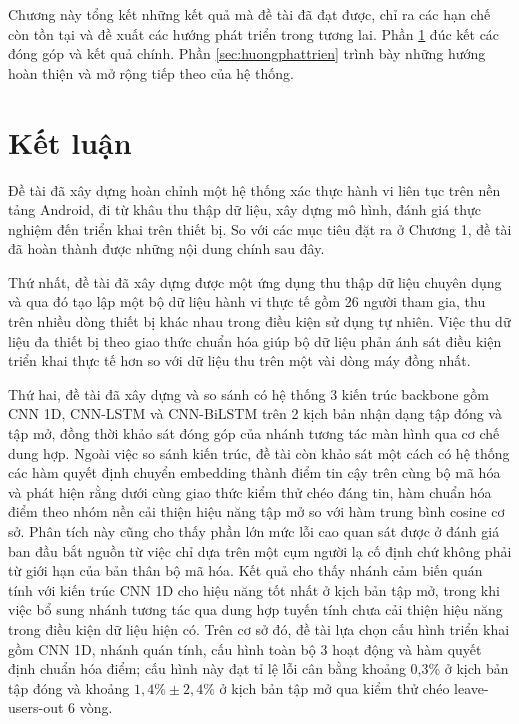 \documentclass[../DoAn.tex]{subfiles}
\begin{document}
Chương này tổng kết những kết quả mà đề tài đã đạt được, chỉ ra các hạn chế còn tồn tại và đề xuất các hướng phát triển trong tương lai. Phần \ref{sec:ketluan} đúc kết các đóng góp và kết quả chính. Phần \ref{sec:huongphattrien} trình bày những hướng hoàn thiện và mở rộng tiếp theo của hệ thống.

\section{Kết luận}
\label{sec:ketluan}

Đề tài đã xây dựng hoàn chỉnh một hệ thống xác thực hành vi liên tục trên nền tảng Android, đi từ khâu thu thập dữ liệu, xây dựng mô hình, đánh giá thực nghiệm đến triển khai trên thiết bị. So với các mục tiêu đặt ra ở Chương 1, đề tài đã hoàn thành được những nội dung chính sau đây.

Thứ nhất, đề tài đã xây dựng được một ứng dụng thu thập dữ liệu chuyên dụng và qua đó tạo lập một bộ dữ liệu hành vi thực tế gồm 26 người tham gia, thu trên nhiều dòng thiết bị khác nhau trong điều kiện sử dụng tự nhiên. Việc thu dữ liệu đa thiết bị theo giao thức chuẩn hóa giúp bộ dữ liệu phản ánh sát điều kiện triển khai thực tế hơn so với dữ liệu thu trên một vài dòng máy đồng nhất.

Thứ hai, đề tài đã xây dựng và so sánh có hệ thống 3 kiến trúc backbone gồm CNN 1D, CNN-LSTM và CNN-BiLSTM trên 2 kịch bản nhận dạng tập đóng và tập mở, đồng thời khảo sát đóng góp của nhánh tương tác màn hình qua cơ chế dung hợp. Ngoài việc so sánh kiến trúc, đề tài còn khảo sát một cách có hệ thống các hàm quyết định chuyển embedding thành điểm tin cậy trên cùng bộ mã hóa và phát hiện rằng dưới cùng giao thức kiểm thử chéo đáng tin, hàm chuẩn hóa điểm theo nhóm nền cải thiện hiệu năng tập mở so với hàm trung bình cosine cơ sở. Phân tích này cũng cho thấy phần lớn mức lỗi cao quan sát được ở đánh giá ban đầu bắt nguồn từ việc chỉ dựa trên một cụm người lạ cố định chứ không phải từ giới hạn của bản thân bộ mã hóa. Kết quả cho thấy nhánh cảm biến quán tính với kiến trúc CNN 1D cho hiệu năng tốt nhất ở kịch bản tập mở, trong khi việc bổ sung nhánh tương tác qua dung hợp tuyến tính chưa cải thiện hiệu năng trong điều kiện dữ liệu hiện có. Trên cơ sở đó, đề tài lựa chọn cấu hình triển khai gồm CNN 1D, nhánh quán tính, cấu hình toàn bộ 3 hoạt động và hàm quyết định chuẩn hóa điểm; cấu hình này đạt tỉ lệ lỗi cân bằng khoảng 0,3\% ở kịch bản tập đóng và khoảng $1,4\% \pm 2,4\%$ ở kịch bản tập mở qua kiểm thử chéo leave-users-out 6 vòng.
\end{document}
